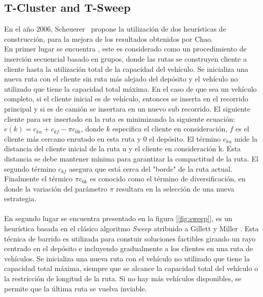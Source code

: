 \documentclass[letter, 10pt]{article}
\begin{document}
\subsection{T-Cluster and T-Sweep}
En el año 2006, Scheuerer~\cite{Scheuerer} propone la utilización de dos heurísticas de construcción, para la mejora de los resultados obtenidos por Chao.\\ En primer lugar se encuentra , este es considerado como un procedimiento de inserción secuencial basado en grupos, donde las rutas se construyen cliente a cliente hasta la utilización total de la capacidad del vehículo. Se inicializa una nueva ruta con el cliente sin ruta más alejado del depósito y el vehículo no utilizado que tiene la capacidad total máxima. En el caso de que sea un vehículo completo, si el cliente inicial es de vehículo, entonces se inserta en el recorrido principal y si es de camión se insertara en un nuevo sub recorrido. El siguiente cliente para ser insertado en la ruta es minimizando la siguiente ecuación: $e(k) = c_{ku}+ c_{kf}-\pi c_{0k}$, donde $k$ especifica el cliente en consideración, $f$ es el cliente más cercano enrutado en esta ruta y 0 el depósito. El término $c_{ku}$ mide la distancia del cliente inicial de la ruta u y el cliente en consideración k. Esta distancia se debe mantener mínima para garantizar la compactitud de la ruta. El segundo término $c_{kf}$ asegura que está cerca del "borde" de la ruta actual. Finalmente el térmico $\pi c_{0k}$ es conocido como el término de diversificación, en donde la variación del parámetro $\pi$ resultara en la selección de una nueva estrategia.
\\\\
En segundo lugar se encuentra  presentado en la figura [\ref{fig:sweep}], es un heurística basada en el clásico algoritmo \textit{Sweep} atribuido a Gillett y Miller \cite{Gillett}. Esta técnica de barrido es utilizada para constuir soluciones factibles girando un rayo centrado en el depósito e incluyendo gradualmente a los clientes en una ruta de vehículos. Se inicializa una nueva ruta con el vehículo no utilizado que tiene la capacidad total máxima, siempre que se alcance la capacidad total del vehículo o la restricción de longitud de la ruta. Si no hay más vehículos disponibles, se permite que la última ruta se vuelva inviable.
\end{document}

